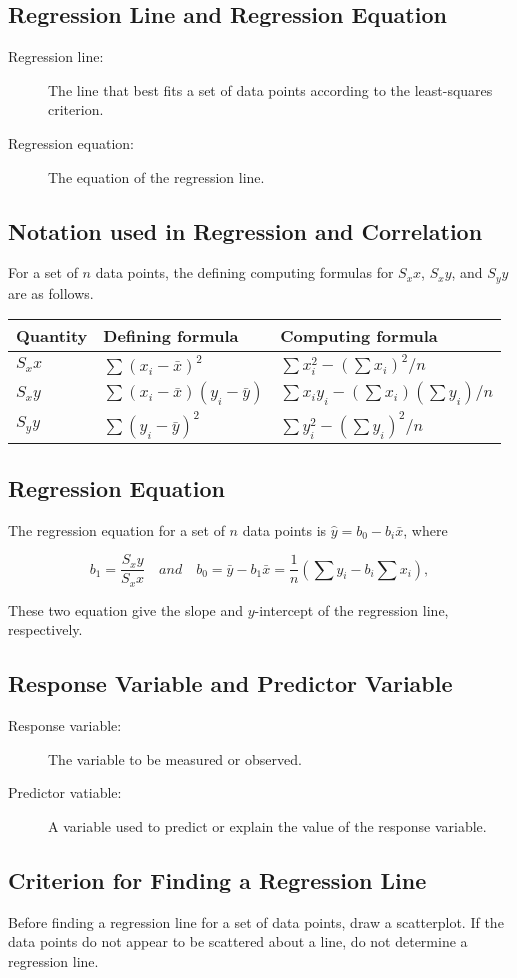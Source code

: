 \documentclass[12pt]{article}
\newcommand\T{\rule{0pt}{2.6ex}}       %
\newcommand\B{\rule[-1.2ex]{0pt}{0pt}} %
\begin{document}
        \subsection*{Regression Line and Regression Equation}
            \begin{description}
                \item[Regression line:] The line that best fits a set of data points according
                to the least-squares criterion.
                \item[Regression equation:] The equation of the regression line.
            \end{description}
        \subsection*{Notation used in Regression and Correlation}
            For a set of $n$ data points, the defining computing formulas for $S_xx$, $S_xy$,
            and $S_yy$ are as follows.
\begin{table}[h!]
    \centering
    \begin{tabular}{l|l|l}
        Quantity&Defining formula&Computing formula \B \\
        \hline
        $S_xx$&$\sum(x_i-\bar{x})^2$&$\sum x_i^2-(\sum x_i)^2/n$ \T\B\\
        $S_xy$&$\sum(x_i-\bar{x})(y_i-\bar{y})$&$\sum x_i y_i-(\sum x_i)(\sum y_i)/n$ \T\B \\
        $S_yy$&$\sum(y_i-\bar{y})^2$&$\sum y_i^2-(\sum y_i)^2/n$ \T \\
    \end{tabular}
\end{table}
        \subsection*{Regression Equation}
            The regression equation for a set of $n$ data points is $\hat{y}=b_0-b_i\bar{x}$,
            where
            \begin{center}
                \[
                    b_1=\frac{S_xy}{S_xx} \quad and \quad b_0=\bar{y}-b_1\bar{x}=
                    \frac{1}{n}(\sum y_i-b_i\sum x_i),
                \]
            \end{center}
            These two equation give the slope and $y$-intercept of the regression line, 
            respectively.
        \subsection*{Response Variable and Predictor Variable}
            \begin{description}
                \item[Response variable:] The variable to be measured or observed.
                \item[Predictor vatiable:] A variable used to predict or explain the value of
                the response variable. 
            \end{description}
        \subsection*{Criterion for Finding a Regression Line}
            Before finding a regression line for a set of data points, draw a scatterplot. If
            the data points do not appear to be scattered about a line, do not determine a
            regression line.
\end{document}
